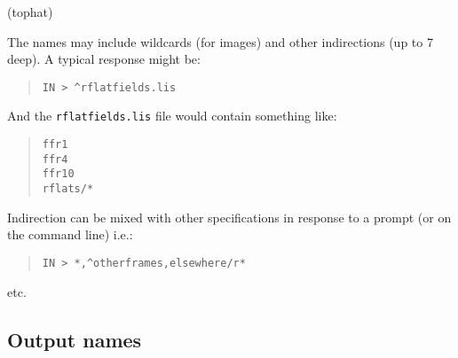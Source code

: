\documentclass[twoside,11pt]{article}
\renewcommand{\_}{\texttt{\symbol{95}}}
\newenvironment{myquote}{\begin{quote}\begin{small}}{\end{small}\end{quote}}
\newcommand{\text}[1]{{\small \tt #1}}
\begin{document}
\begin{description}
   \item \hspace{13pt}{\bf$^\wedge$}\hspace{3ex}   (tophat)
\end{description}

The names may include wildcards (for images) and other indirections (up to
7 deep). A typical response might be:
\begin{myquote}
\begin{verbatim}
IN > ^rflatfields.lis
\end{verbatim}
\end{myquote}

And the \text{rflatfields.lis} file would contain something like:
\begin{myquote}
\begin{verbatim}
ffr1
ffr4
ffr10
rflats/*
\end{verbatim}
\end{myquote}

Indirection can be mixed with other specifications in response to a
prompt (or on the command line) i.e.:
\begin{myquote}
\begin{verbatim}
IN > *,^otherframes,elsewhere/r*
\end{verbatim}
\end{myquote}
etc.

\subsection{Output names}
\end{document}
